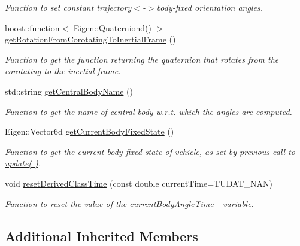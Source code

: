 \begin{DoxyCompactItemize}
\begin{DoxyCompactList}\small\item\em Function to set constant trajectory$<$-\/$>$body-\/fixed orientation angles. \end{DoxyCompactList}\item 
boost\+::function$<$ Eigen\+::\+Quaterniond() $>$ \hyperlink{classtudat_1_1reference__frames_1_1AerodynamicAngleCalculator_ac33bcade09603d504123a5200348752b}{get\+Rotation\+From\+Corotating\+To\+Inertial\+Frame} ()
\begin{DoxyCompactList}\small\item\em Function to get the function returning the quaternion that rotates from the corotating to the inertial frame. \end{DoxyCompactList}\item 
std\+::string \hyperlink{classtudat_1_1reference__frames_1_1AerodynamicAngleCalculator_a9929cecdca0cfc997f41f8fd1bf6d1ad}{get\+Central\+Body\+Name} ()
\begin{DoxyCompactList}\small\item\em Function to get the name of central body w.\+r.\+t. which the angles are computed. \end{DoxyCompactList}\item 
Eigen\+::\+Vector6d \hyperlink{classtudat_1_1reference__frames_1_1AerodynamicAngleCalculator_acb987f236459228bf4c3248a4bebe18d}{get\+Current\+Body\+Fixed\+State} ()
\begin{DoxyCompactList}\small\item\em Function to get the current body-\/fixed state of vehicle, as set by previous call to \hyperlink{classtudat_1_1reference__frames_1_1AerodynamicAngleCalculator_acdeec390f822d521bcb3c09168da5a57}{update( )}. \end{DoxyCompactList}\item 
void \hyperlink{classtudat_1_1reference__frames_1_1AerodynamicAngleCalculator_af68c8b73b9ec1e17d6e36cadd525e633}{reset\+Derived\+Class\+Time} (const double current\+Time=T\+U\+D\+A\+T\+\_\+\+N\+AN)
\begin{DoxyCompactList}\small\item\em Function to reset the value of the current\+Body\+Angle\+Time\+\_\+ variable. \end{DoxyCompactList}\end{DoxyCompactItemize}
\subsection*{Additional Inherited Members}


